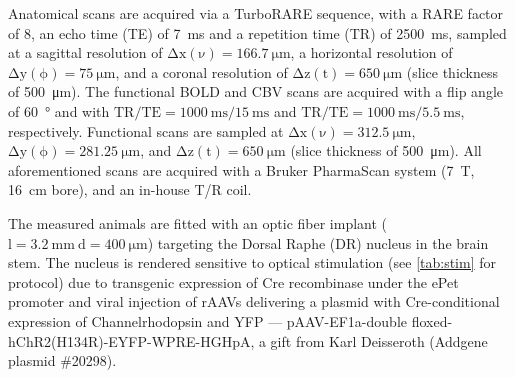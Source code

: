 Anatomical scans are acquired via a TurboRARE sequence, with a RARE factor of 8, an echo time (TE) of \SI{7}{\milli\second} and a repetition time (TR) of \SI{2500}{\milli\second}, sampled at a sagittal resolution of $\mathrm{\Delta x(\nu)=\SI{166.7}{\micro\meter}}$, a horizontal resolution of $\mathrm{\Delta y(\phi)=\SI{75}{\micro\meter}}$, and a coronal resolution of $\mathrm{\Delta z(t)=\SI{650}{\micro\meter}}$ (slice thickness of \SI{500}{\micro\meter}).
The functional BOLD and CBV scans are acquired with a flip angle of \SI{60}{\degree} and with $\mathrm{TR/TE = \SI{1000}{\milli\second}/\SI{15}{\milli\second}}$ and $\mathrm{TR/TE = \SI{1000}{\milli\second}/\SI{5.5}{\milli\second}}$, respectively.
Functional scans are sampled at $\mathrm{\Delta x(\nu)=\SI{312.5}{\micro\meter}}$, $\mathrm{\Delta y(\phi)=\SI{281.25}{\micro\meter}}$, and $\mathrm{\Delta z(t)=\SI{650}{\micro\meter}}$ (slice thickness of \SI{500}{\micro\meter}).
All aforementioned scans are acquired with a Bruker PharmaScan system (\SI{7}{\tesla}, \SI{16}{\centi\meter} bore), and an in-house T/R coil.

The measured animals are fitted with an optic fiber implant ($\mathrm{l=\SI{3.2}{\milli\meter} \ d=\SI{400}{\micro\meter}}$) targeting the Dorsal Raphe (DR) nucleus in the brain stem.
The nucleus is rendered sensitive to optical stimulation (see \cref{tab:stim} for protocol) due to transgenic expression of Cre recombinase under the ePet promoter \cite{Scott2005} and viral injection of rAAVs delivering a plasmid with Cre-conditional expression of Channelrhodopsin and YFP ---
pAAV-EF1a-double floxed-hChR2(H134R)-EYFP-WPRE-HGHpA, a gift from Karl Deisseroth (Addgene plasmid \#20298).
